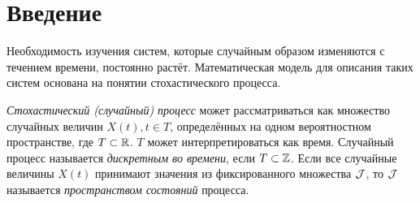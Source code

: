 \chapter*{Введение}							%

Необходимость изучения систем, которые случайным образом изменяются с течением времени, постоянно растёт. Математическая модель для описания таких систем основана на понятии стохастического процесса.

\emph{Стохастический (случайный) процесс} может рассматриваться как множество случайных величин $X(t), t \in T$, определённых на одном вероятностном пространстве, где $T \subset \mathbb{R}$. $T$ может интерпретироваться как время. Случайный процесс называется \emph{дискретным во времени}, если $T \subset \mathbb{Z}$. Если все случайные величины $X(t)$ принимают значения из фиксированного множества $\mathcal{J}$, то $\mathcal{J}$ называется \emph{пространством состояний} процесса.

\clearpage
